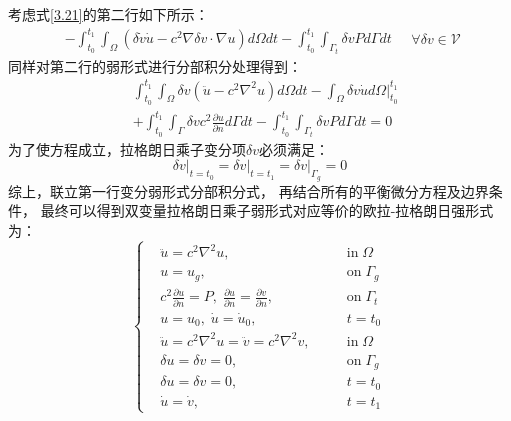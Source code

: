 考虑式\eqref{3.21}的第二行如下所示：
\begin{equation}
    \begin{aligned}
    - \int_{t_0}^{t_1} \int_{\Omega} (\delta \dot v \dot u - c^2 \nabla \delta v \cdot \nabla u) d\Omega dt - \int_{t_0}^{t_1} \int_{\Gamma_t} \delta v P d\Gamma dt 
    \end{aligned}
    \quad \forall \delta v \in \mathcal{V}
\end{equation}
同样对第二行的弱形式进行分部积分处理得到：
\begin{equation}
    \begin{aligned}
        & \int_{t_0}^{t_1} \int_{\Omega} \delta v (\ddot u - c^2 \nabla^2 u) d\Omega dt 
         - \int_{\Omega} \delta v \dot u d\Omega \bigg|^{t_1}_{t_0} \\
        &+ \int_{t_0}^{t_1} \int_{\Gamma} \delta v c^2 \frac{\partial u}{\partial n} d\Gamma dt 
        - \int_{t_0}^{t_1} \int_{\Gamma_t} \delta v P d\Gamma dt = 0
    \end{aligned}
\end{equation}
为了使方程成立，拉格朗日乘子变分项$\delta v$必须满足：
\begin{equation}
    \delta v \vert_{t=t_0} = \delta v \vert_{t=t_1} =  \delta v \vert_{\Gamma_g} = 0
\end{equation}
综上，联立第一行变分弱形式分部积分式，
再结合所有的平衡微分方程及边界条件，
最终可以得到双变量拉格朗日乘子弱形式对应等价的欧拉-拉格朗日强形式为：
\begin{equation}\label{3ddengjia}
    \left \{
        \begin{aligned}
            &\ddot u = c^2 \nabla^2 u,  \quad && \text{in}\; \Omega \\
            &u = u_g, \quad &&\text{on} \; \Gamma_g \;  \\
            &c^2 \frac{\partial u}{\partial n}  = P, \; \frac{\partial u}{\partial n} = \frac{\partial v}{\partial n}, \quad &&\text{on}\;\Gamma_t \;  \\
            &u= u_0, \; \dot u = \dot u_0, && t=t_0   \\
            &\ddot u = c^2 \nabla^2 u =  \ddot v = c^2 \nabla^2 v, \quad && \text{in} \; \Omega \\
            &\delta u = \delta v = 0, \quad &&\text{on} \; \Gamma_g \;  \\
            &\delta u = \delta v = 0, && t=t_0   \\
            &\dot{u} = \dot v, && t=t_1
        \end{aligned}
    \right .
\end{equation}


